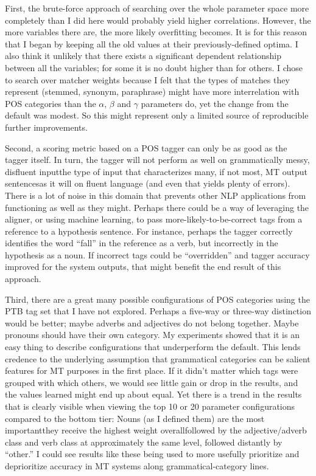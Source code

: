 \documentclass[paper=a4, fontsize=11pt]{scrartcl}
\numberwithin{equation}{section}		%
\numberwithin{figure}{section}			%
\numberwithin{table}{section}				%
\begin{document}
First, the brute-force approach of searching over the whole parameter space more completely than I did here would probably yield higher correlations.  However, the more variables there are, the more likely overfitting becomes.  It is for this reason that I began by keeping all the old values at their previously-defined optima.  I also think it unlikely that there exists a significant dependent relationship between all the variables; for some it is no doubt higher than for others.  I chose to search over matcher weights because I felt that the types of matches they represent (stemmed, synonym, paraphrase) might have more interrelation with POS categories than the $\alpha$, $\beta$ and $\gamma$ parameters do, yet the change from the default was modest.  So this might represent only a limited source of reproducible further improvements.

Second, a scoring metric based on a POS tagger can only be as good as the tagger itself.  In turn, the tagger will not perform as well on grammatically messy, disfluent input\textemdash the type of input that characterizes many, if not most, MT output sentences\textemdash as it will on fluent language (and even that yields plenty of errors).  There is a lot of noise in this domain that prevents other NLP applications from functioning as well as they might.  Perhaps there could be a way of leveraging the aligner, or using machine learning, to pass more-likely-to-be-correct tags from a reference to a hypothesis sentence.  For instance, perhaps the tagger correctly identifies the word ``fall'' in the reference as a verb, but incorrectly in the hypothesis as a noun.  If incorrect tags could be ``overridden'' and tagger accuracy improved for the system outputs, that might benefit the end result of this approach.

Third, there are a great many possible configurations of POS categories using the PTB tag set that I have not explored.  Perhaps a five-way or three-way distinction would be better; maybe adverbs and adjectives do not belong together.  Maybe pronouns should have their own category.  My experiments showed that it is an easy thing to describe configurations that underperform the default.  This lends credence to the underlying assumption that grammatical categories can be salient features for MT purposes in the first place.  If it didn't matter which tags were grouped with which others, we would see little gain or drop in the results, and the values learned might end up about equal.  Yet there is a trend in the results that is clearly visible when viewing the top 10 or 20 parameter configurations compared to the bottom tier:  Nouns (as I defined them) are the most important\textemdash they receive the highest weight overall\textemdash followed by the adjective/adverb class and verb class at approximately the same level, followed distantly by ``other.''  I could see results like these being used to more usefully prioritize and deprioritize accuracy in MT systems along grammatical-category lines.
\end{document}
